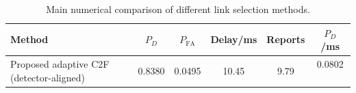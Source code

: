 \begin{table}[t]
    \centering
    \caption{Main numerical comparison of different link selection methods.}
    \label{tab:main_summary}
    \begin{tabular}{l c c c c c}
        \hline
        Method & $P_D$ & $P_{\mathrm{FA}}$ & Delay/ms & Reports & $P_D$/ms \\
        \hline
        Proposed adaptive C2F (detector-aligned) & 0.8380 & 0.0495 & 10.45 & 9.79 & 0.0802 \
        \hline
    \end{tabular}
\end{table}
